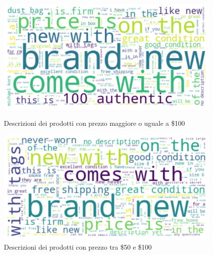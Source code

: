 \begin{figure}[H]
   \begin{minipage}{0.48\textwidth}
     \centering
     \includegraphics[width=.9\linewidth]{maggiore_100}
	\caption{Descrizioni dei prodotti con prezzo maggiore o uguale a \$100}
	\label{fig:100}   
	\end{minipage}\hfill
   \begin{minipage}{0.48\textwidth}
     \centering
     \includegraphics[width=.9\linewidth]{50_100}
     \caption{Descrizioni dei prodotti con prezzo tra \$50 e \$100}
     \label{Fig:50_100}
   \end{minipage}
\end{figure}

